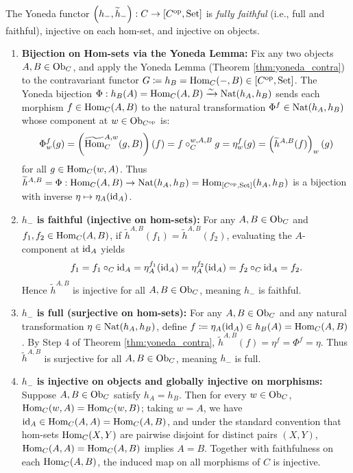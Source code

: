 \documentclass[10pt,a4paper]{article}
\begin{document}
\begin{theorem}\label{thm:yoneda_emb}
The Yoneda functor $\left(h_-, \widetilde{h}_-\right) : C \to [C^{\textrm{op}}, {\textrm{Set}}]$ is \emph{fully faithful} (i.e., full and faithful), injective on each hom-set, and injective on objects.
\end{theorem}
\myprf
\begin{enumerate}
\item \textbf{Bijection on Hom-sets via the Yoneda Lemma:}
Fix any two objects $A, B \in {\textrm{Ob}}_C$, and apply the Yoneda Lemma (Theorem \ref{thm:yoneda_contra}) to the contravariant functor $G \coloneqq h_B = {\textrm{Hom}}_C(-,B) \in [C^{\textrm{op}}, {\textrm{Set}}]$.
The Yoneda bijection $\Phi : h_B(A) = {\textrm{Hom}}_C(A,B) \xrightarrow{\sim} {\textrm{Nat}}(h_A, h_B)$ sends each morphism $f \in {\textrm{Hom}}_C(A,B)$ to the natural transformation $\Phi^f \in {\textrm{Nat}}(h_A, h_B)$ whose component at $w \in {\textrm{Ob}}_{C^{\textrm{op}}}$ is:
$$\Phi^f_w(g) = \left({\widetilde{{\textrm{Hom}}}\textrm{}}_C^{A,w}(g, B)\right)(f) = f \circ_C^{w,A,B} g = \eta^f_w(g) = \left(\widetilde{h}^{A,B}(f)\right)_w(g)$$
for all $g \in {\textrm{Hom}}_C(w,A)$. Thus $\widetilde{h}^{A,B} = \Phi : {\textrm{Hom}}_C(A,B) \to {\textrm{Nat}}(h_A, h_B) = {\textrm{Hom}}_{[C^{\textrm{op}},{\textrm{Set}}]}(h_A, h_B)$ is a bijection with inverse $\eta \mapsto \eta_A({\textrm{id}}_A)$.

\item \textbf{$h_-$ is faithful (injective on hom-sets):}
For any $A, B \in {\textrm{Ob}}_C$ and $f_1, f_2 \in {\textrm{Hom}}_C(A,B)$, if $\widetilde{h}^{A,B}(f_1) = \widetilde{h}^{A,B}(f_2)$, evaluating the $A$-component at ${\textrm{id}}_A$ yields
$$f_1 = f_1 \circ_C {\textrm{id}}_A = \eta^{f_1}_A({\textrm{id}}_A) = \eta^{f_2}_A({\textrm{id}}_A) = f_2 \circ_C {\textrm{id}}_A = f_2.$$
Hence $\widetilde{h}^{A,B}$ is injective for all $A,B \in {\textrm{Ob}}_C$, meaning $h_-$ is faithful.

\item \textbf{$h_-$ is full (surjective on hom-sets):}
For any $A, B \in {\textrm{Ob}}_C$ and any natural transformation $\eta \in {\textrm{Nat}}(h_A, h_B)$, define $f \coloneqq \eta_A({\textrm{id}}_A) \in h_B(A) = {\textrm{Hom}}_C(A,B)$. By Step 4 of Theorem \ref{thm:yoneda_contra}, $\widetilde{h}^{A,B}(f) = \eta^f = \Phi^f = \eta$. Thus $\widetilde{h}^{A,B}$ is surjective for all $A,B \in {\textrm{Ob}}_C$, meaning $h_-$ is full.

\item \textbf{$h_-$ is injective on objects and globally injective on morphisms:}
Suppose $A, B \in {\textrm{Ob}}_C$ satisfy $h_A = h_B$. Then for every $w \in {\textrm{Ob}}_C$, ${\textrm{Hom}}_C(w,A) = {\textrm{Hom}}_C(w,B)$; taking $w = A$, we have ${\textrm{id}}_A \in {\textrm{Hom}}_C(A,A) = {\textrm{Hom}}_C(A,B)$, and under the standard convention that hom-sets ${\textrm{Hom}}_C(X,Y)$ are pairwise disjoint for distinct pairs $(X,Y)$, ${\textrm{Hom}}_C(A,A) = {\textrm{Hom}}_C(A,B)$ implies $A = B$. Together with faithfulness on each ${\textrm{Hom}}_C(A,B)$, the induced map on all morphisms of $C$ is injective.
\end{enumerate}
\myqed
\end{document}
